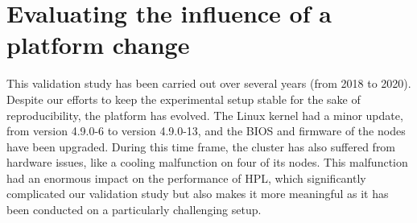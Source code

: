     \section{Evaluating the influence of a platform change}%
    \label{sec:platform_change}
        This validation study has been carried out over several years (from 2018 to 2020). Despite our efforts to keep
        the experimental setup stable for the sake of reproducibility, the platform has evolved. The Linux kernel had a
        minor update, from version 4.9.0-6 to version 4.9.0-13, and the BIOS and firmware of the nodes have been
        upgraded. During this time frame, the cluster has also suffered from hardware issues, like a cooling malfunction
        on four of its nodes. This malfunction had an enormous impact on the performance of HPL, which significantly
        complicated our validation study but also makes it more meaningful as it has been conducted on a particularly
        challenging setup.

